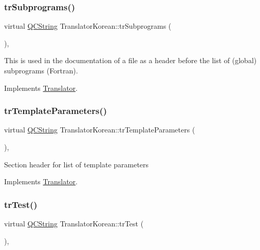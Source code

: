 \subsubsection{\texorpdfstring{trSubprograms()}{trSubprograms()}}
{\footnotesize\ttfamily virtual \mbox{\hyperlink{class_q_c_string}{Q\+C\+String}} Translator\+Korean\+::tr\+Subprograms (\begin{DoxyParamCaption}{ }\end{DoxyParamCaption})\hspace{0.3cm}{\ttfamily [inline]}, {\ttfamily [virtual]}}

This is used in the documentation of a file as a header before the list of (global) subprograms (Fortran). 

Implements \mbox{\hyperlink{class_translator}{Translator}}.

\mbox{\label{class_translator_korean_aeae11aa112012a4945a724857f636acf}} 
\subsubsection{\texorpdfstring{trTemplateParameters()}{trTemplateParameters()}}
{\footnotesize\ttfamily virtual \mbox{\hyperlink{class_q_c_string}{Q\+C\+String}} Translator\+Korean\+::tr\+Template\+Parameters (\begin{DoxyParamCaption}{ }\end{DoxyParamCaption})\hspace{0.3cm}{\ttfamily [inline]}, {\ttfamily [virtual]}}

Section header for list of template parameters 

Implements \mbox{\hyperlink{class_translator}{Translator}}.

\mbox{\label{class_translator_korean_a1f2f12bb760a8c49b7a12aa3adb72dbf}} 
\subsubsection{\texorpdfstring{trTest()}{trTest()}}
{\footnotesize\ttfamily virtual \mbox{\hyperlink{class_q_c_string}{Q\+C\+String}} Translator\+Korean\+::tr\+Test (\begin{DoxyParamCaption}{ }\end{DoxyParamCaption})\hspace{0.3cm}{\ttfamily [inline]}, {\ttfamily [virtual]}}

